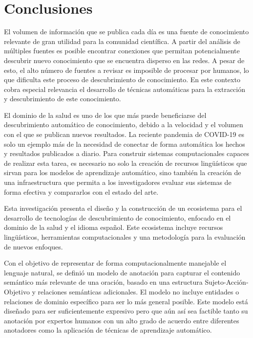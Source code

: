\chapter{Conclusiones}\label{Chap:Conclusions}

El volumen de información que se publica cada día es una fuente de conocimiento relevante de gran utilidad para la comunidad científica. A partir del análisis de múltiples fuentes es posible encontrar conexiones que permitan potencialmente descubrir nuevo conocimiento que se encuentra disperso en las redes.
A pesar de esto, el alto número de fuentes a revisar es imposible de procesar por humanos, lo que dificulta este proceso de descubrimiento de conocimiento.
En este contexto cobra especial relevancia el desarrollo de técnicas automáticas para la extracción y descubrimiento de este conocimiento.

El dominio de la salud es uno de los que más puede beneficiarse del descubrimiento automático de conocimiento, debido a la velocidad y el volumen con el que se publican nuevos resultados. La reciente pandemia de COVID-19 es solo un ejemplo más de la necesidad de conectar de forma automática los hechos y resultados publicados a diario. Para construir sistemas computacionales capaces de realizar esta tarea, es necesario no solo la creación de recursos lingüísticos que sirvan para los modelos de aprendizaje automático, sino también la creación de una infraestructura que permita a los investigadores evaluar sus sistemas de forma efectiva y compararlos con el estado del arte.

Esta investigación presenta el diseño y la construcción de un ecosistema para el desarrollo de tecnologías de descubrimiento de conocimiento, enfocado en el dominio de la salud y el idioma español. 
Este ecosistema incluye recursos lingüísticos, herramientas computacionales y una metodología para la evaluación de nuevos enfoques.

Con el objetivo de representar de forma computacionalmente manejable el lenguaje natural, se definió un modelo de anotación para capturar el contenido semántico más relevante de una oración, basado en una estructura Sujeto-Acción-Objetivo y relaciones semánticas adicionales.
El modelo no incluye entidades o relaciones de dominio específico para ser lo más general posible. Este modelo está diseñado para ser suficientemente expresivo pero que aún así sea factible tanto su anotación por expertos humanos con un alto grado de acuerdo entre diferentes anotadores como la aplicación de técnicas de aprendizaje automático.

